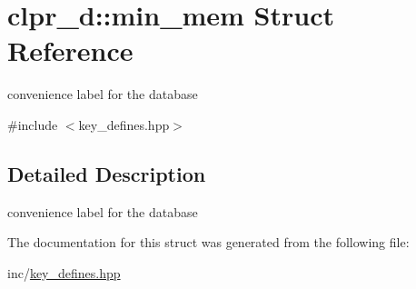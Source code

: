 \hypertarget{structclpr__d_1_1min__mem}{\section{clpr\-\_\-d\-:\-:min\-\_\-mem \-Struct \-Reference}
\label{structclpr__d_1_1min__mem}
}


convenience label for the database  




{\ttfamily \#include $<$key\-\_\-defines.\-hpp$>$}



\subsection{\-Detailed \-Description}
convenience label for the database 

\-The documentation for this struct was generated from the following file\-:\begin{DoxyCompactItemize}
\item 
inc/\hyperlink{key__defines_8hpp}{key\-\_\-defines.\-hpp}\end{DoxyCompactItemize}
